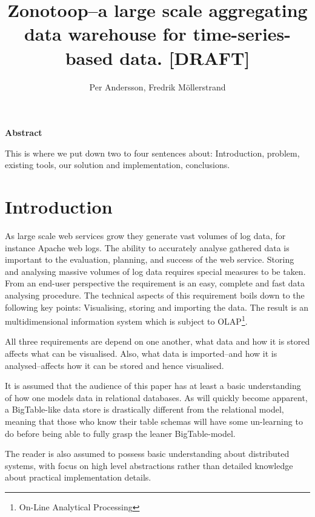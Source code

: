 \documentclass[a4paper,10pt]{book}
\author{Per Andersson, Fredrik M{\"o}llerstrand}
\title{Zonotoop--a large scale aggregating data warehouse for
time-series-based data. [DRAFT]}
\begin{document}
\maketitle



\noindent \Large{\textbf{Abstract}}

\vspace{12pt}

\noindent This is where we put down two to four sentences about:
Introduction, problem, existing tools, our solution and implementation,
conclusions.


\tableofcontents

\vfill

\pagebreak



\chapter{Introduction}

As large scale web services grow they generate vast volumes of log data,
for instance Apache web logs. The ability to accurately analyse gathered
data is important to the evaluation, planning, and success of the web
service. Storing and analysing massive volumes of log data requires
special measures to be taken. From an end-user perspective the requirement
is an easy, complete and fast data analysing procedure. The technical
aspects of this requirement boils down to the following key points:
Visualising, storing and importing the data. The result is an
multidimensional information system which is subject to
OLAP\footnote{On-Line Analytical Processing}. \cite{olap_solutions}

All three requirements are depend on one another, what data and how it is
stored affects what can be visualised. Also, what data is imported--and
how it is analysed--affects how it can be stored and hence visualised.

It is assumed that the audience of this paper has at least a basic
understanding of how one models data in relational databases. As will
quickly become apparent, a BigTable-like \cite{bigtable} data store is
drastically different from the relational model, meaning that those who
know their table schemas will have some un-learning to do before being able
to fully grasp the leaner BigTable-model.

The reader is also assumed to possess basic understanding about distributed
systems, with focus on high level abstractions rather than detailed
knowledge about practical implementation details.
\end{document}
